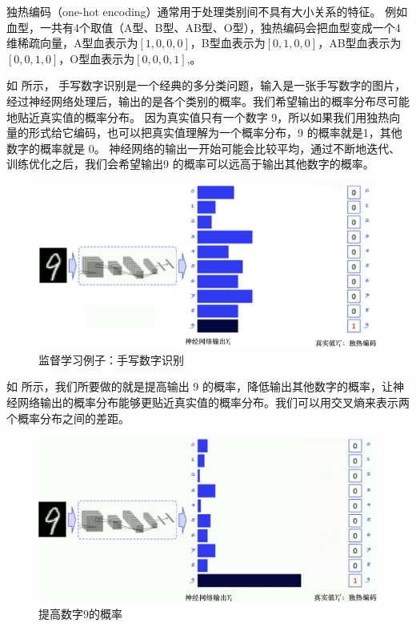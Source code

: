 \begin{tcolorbox}[colframe=blue!25,colback=blue!10]
独热编码（one-hot encoding）通常用于处理类别间不具有大小关系的特征。 例如血型，一共有4个取值（A型、B型、AB型、O型），独热编码会把血型变成一个4维稀疏向量，A型血表示为$[1,0,0,0]$，B型血表示为$[0,1,0,0]$，AB型血表示为$[0,0,1,0]$，O型血表示为$[0,0,0,1]$,。
\end{tcolorbox}

如 所示，
手写数字识别是一个经典的多分类问题，输入是一张手写数字的图片，经过神经网络处理后，输出的是各个类别的概率。我们希望输出的概率分布尽可能地贴近真实值的概率分布。
因为真实值只有一个数字 9，所以如果我们用独热向量的形式给它编码，也可以把真实值理解为一个概率分布，9 的概率就是1，其他数字的概率就是 0。
神经网络的输出一开始可能会比较平均，通过不断地迭代、训练优化之后，我们会希望输出9 的概率可以远高于输出其他数字的概率。

\begin{figure}[hbt]
    \centering
    \includegraphics[width=0.5\linewidth]{ch6/figs/mnist_recognition.png}
    \caption{监督学习例子：手写数字识别}
    \label{fig:mnist_recognition}
\end{figure}

如 所示，我们所要做的就是提高输出 9 的概率，降低输出其他数字的概率，让神经网络输出的概率分布能够更贴近真实值的概率分布。我们可以用交叉熵来表示两个概率分布之间的差距。

\begin{figure}[hbt]
    \centering
    \includegraphics[width=0.5\linewidth]{ch6/figs/improve_nine_prob.png}
    \caption{提高数字9的概率}
    \label{fig:improve_nine_prob}
\end{figure}

